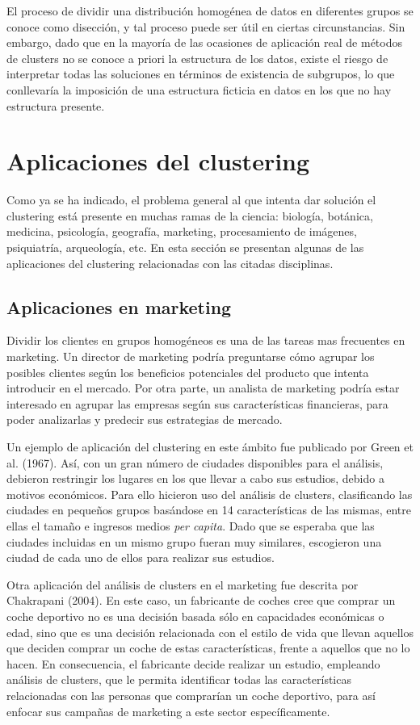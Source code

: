 El proceso de dividir una distribución homogénea de datos en diferentes grupos se conoce como disección, y tal proceso puede ser útil en ciertas circunstancias. Sin embargo, dado que en la mayoría de las ocasiones de aplicación real de métodos de clusters no se conoce a priori la estructura de los datos, existe el riesgo de interpretar todas las soluciones en términos de existencia de subgrupos, lo que conllevaría la imposición de una estructura ficticia en datos en los que no hay estructura presente.

\section{Aplicaciones del clustering}

Como ya se ha indicado, el problema general al que intenta dar solución el clustering está presente en muchas ramas de la ciencia: biología, botánica, medicina, psicología, geografía, marketing, procesamiento de imágenes, psiquiatría, arqueología, etc. En esta sección se presentan algunas de las aplicaciones del clustering relacionadas con las citadas disciplinas.

\subsection{Aplicaciones en marketing}

Dividir los clientes en grupos homogéneos es una de las tareas mas frecuentes en marketing. Un director de marketing podría preguntarse cómo agrupar los posibles clientes según los beneficios potenciales del producto que intenta introducir en el mercado. Por otra parte, un analista de marketing podría estar interesado en agrupar las empresas según sus características financieras, para poder analizarlas y predecir sus estrategias de mercado.

Un ejemplo de aplicación del clustering en este ámbito fue publicado por Green et al. (1967). Así, con un gran número de ciudades disponibles para el análisis, debieron restringir los lugares en los que llevar a cabo sus estudios, debido a motivos económicos. Para ello hicieron uso del análisis de clusters, clasificando las ciudades en pequeños grupos basándose en 14 características de las mismas, entre ellas el tamaño e ingresos medios \textit{per capita}. Dado que se esperaba que las ciudades incluidas en un mismo grupo fueran muy similares, escogieron una ciudad de cada uno de ellos para realizar sus estudios.

Otra aplicación del análisis de clusters en el marketing fue descrita por Chakrapani (2004). En este caso, un fabricante de coches cree que comprar un coche deportivo no es una decisión basada sólo en capacidades económicas o edad, sino que es una decisión relacionada con el estilo de vida que llevan aquellos que deciden comprar un coche de estas características, frente a aquellos que no lo hacen. En consecuencia, el fabricante decide realizar un estudio, empleando análisis de clusters, que le permita identificar todas las características relacionadas con las personas que comprarían un coche deportivo, para así enfocar sus campañas de marketing a este sector específicamente.

